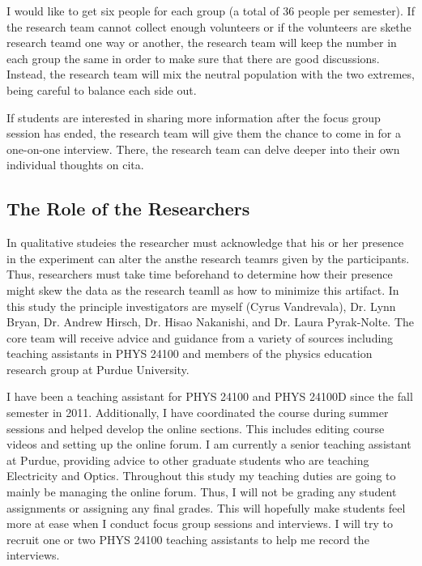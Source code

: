 I would like to get six people for each group (a total of 36 people per semester). If the research team cannot collect enough volunteers or if the volunteers are skethe research teamd one way or another, the research team will keep the number in each group the same in order to make sure that there are good discussions. Instead, the research team will mix the neutral population with the two extremes, being careful to balance each side out.

If students are interested in sharing more information after the focus group session has ended, the research team will give them the chance to come in for a one-on-one interview. There, the research team can delve deeper into their own individual thoughts on \gls{cita}.

\subsection{The Role of the Researchers}

In qualitative studeies the researcher must acknowledge that his or her presence in the experiment can alter the ansthe research teamrs given by the participants. Thus, researchers must take time beforehand to determine how their presence might skew the data as the research teamll as how to minimize this artifact\cite{denzin2012}. In this study the principle investigators are myself (Cyrus Vandrevala), Dr. Lynn Bryan, Dr. Andrew Hirsch, Dr. Hisao Nakanishi, and Dr. Laura Pyrak-Nolte. The core team will receive advice and guidance from a variety of sources including teaching assistants in PHYS 24100 and members of the physics education research group at Purdue University.

I have been a teaching assistant for PHYS 24100 and PHYS 24100D since the fall semester in 2011. Additionally, I have coordinated the course during summer sessions and helped develop the online sections. This includes editing course videos and setting up the online forum\cite{piazza}. I am currently a senior teaching assistant at Purdue, providing advice to other graduate students who are teaching Electricity and Optics. Throughout this study my teaching duties are going to mainly be managing the online forum. Thus, I will not be grading any student assignments or assigning any final grades. This will hopefully make students feel more at ease when I conduct focus group sessions and interviews. I will try to recruit one or two PHYS 24100 teaching assistants to help me record the interviews.

